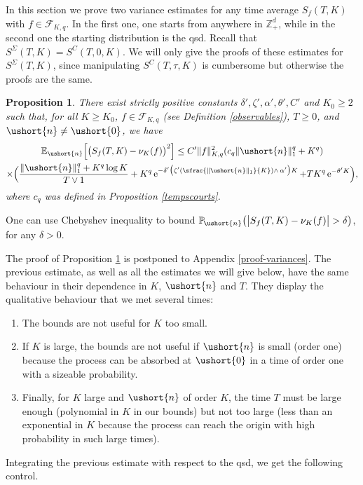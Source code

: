 \documentclass[10pt]{amsart}
\newcommand{\Psfrac}[2]{(\sfrac{#1}{#2})}
\newcommand{\scaleto}[2]{#1}
\numberwithin{equation}{section}
\theoremstyle{plain}
\newtheorem{proposition}[theorem]{Proposition}
\theoremstyle{definition}
\newcommand{\proba}{{\mathbb{P}}}
\newcommand{\E}{{\mathbb{E}}}
\newcommand{\zentiers}{{\mathbb{Z}}}
\newcommand{\domaine}{\zentiers_{+}^{d}}
\newcommand{\sK}{K}
\newcommand{\vecn}{\ushort{n}}
\newcommand{\veczer}{\ushort{0}}
\newcommand{\nuk}{\nu_{K}}\let\snuk\nuk
\newcommand{\e}{\operatorname{e}}
\newcommand{\norm}[1]{\|#1\|_{1}}\let\snorm\norm
\begin{document}
In this section we prove two variance estimates for any time average $S_{f}(T,K)$ with $f\in \mathscr{F}\!_{\sK,q}$.
In the first one, one starts from anywhere in $\domaine$, while in the second one the starting distribution is the qsd.
Recall that $S^{{ \Sigma}}(T,K)=S^{C}(T,0,K)$. We will only give the proofs of these
estimates for $S^{{ \Sigma}}(T,K)$, since manipulating $S^{C}(T,\tau,K)$ is cumbersome but
otherwise the proofs are the same.

\begin{proposition}\label{varcorn}
There exist strictly positive constants $\delta', \zeta', \alpha', \theta', C'$ and $K_0\geq 2$ such that, for all $K\geq K_0$,
$f\!\in\!\mathscr{F}\!_{\sK,q}$ (see Definition \ref{observables}), $T\geq 0$, and $\vecn\neq \veczer$, we have%
\begin{multline*}
\E_{\vecn}\Bigl[\bigl(S_{f}(T,K)-\nuk(f)\bigr)^2\Bigr]
\leq C' \|f\|_{\sK,q}^2(c_q\norm{\vecn}^{\scaleto{q}{3.8pt}} +K^q)\\
\times
\Bigl(
\frac{\norm{\vecn}^{\scaleto{q}{3.6pt}} +K^q \log K}{T\vee 1}+
K^q \e^{-\delta'\bigl(\zeta' \Psfrac{\|\vecn\|_{1}}{K}\wedge \,\alpha'\bigr)K}+ T K^q \e^{-\theta' K}
\Bigr),
\end{multline*}
where $c_q$ was defined in Proposition \ref{tempscourts}.
\end{proposition}

One can use Chebyshev inequality to bound $\proba_{\!\vecn}\bigl(\big|S_{f}(T,K)-\nuk(f)\big|>\delta\bigr)$,
for any $\delta>0$.

The proof of Proposition \ref{varcorn} is postponed to Appendix \ref{proof-variances}.
The previous estimate, as well as all the estimates we will give below, have the same behaviour in their dependence in $K$, $\vecn$ and
$T$. They display the qualitative behaviour that we met several times:
\begin{enumerate}
\item The bounds are not useful for $K$ too small.
\item If $K$ is large, the bounds are not useful if $\vecn$ is small (order one) because the process can be absorbed at
$\veczer$ in a time of order one with a sizeable probability.
\item Finally, for $K$ large and $\vecn$ of order $K$, the time $T$ must be large enough (polynomial in $K$ in
our bounds) but not too large (less than an exponential in $K$ because the process can reach the origin with high probability in
such large times).
\end{enumerate}
Integrating the previous estimate with respect to the qsd, we get the following control.
\end{document}
